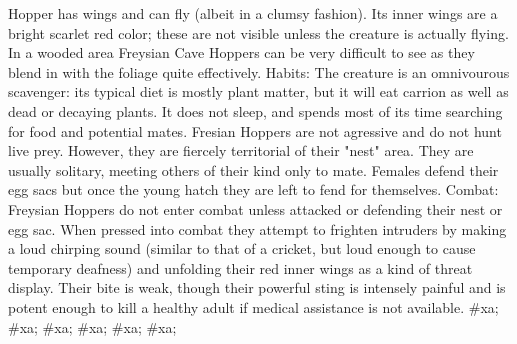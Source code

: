 \documentclass[twoside]{book}
\begin{document}
\begin{multicols}{2}
{           Hopper has wings and can fly (albeit in a clumsy fashion). Its
           inner wings are a bright scarlet red color; these are not
           visible unless the creature is actually flying. In a wooded
           area Freysian Cave Hoppers can be very difficult to see as
           they blend in with the foliage quite effectively. Habits: The
           creature is an omnivourous scavenger: its typical diet is
           mostly plant matter, but it will eat carrion as well as dead
           or decaying plants. It does not sleep, and spends most of its
           time searching for food and potential mates. Fresian Hoppers
           are not agressive and do not hunt live prey. However, they are
           fiercely territorial of their "nest" area. They are usually
           solitary, meeting others of their kind only to mate. Females
           defend their egg sacs but once the young hatch they are left
           to fend for themselves. Combat: Freysian Hoppers do not enter
           combat unless attacked or defending their nest or egg sac.
           When pressed into combat they attempt to frighten intruders by
           making a loud chirping sound (similar to that of a cricket,
           but loud enough to cause temporary deafness) and unfolding
           their red inner wings as a kind of threat display. Their bite
           is weak, though their powerful sting is intensely painful and
           is potent enough to kill a healthy adult if medical assistance
           is not available. }\vspace{1ex}
    \hspace{-2ex}
\#xa;
\#xa;
\vspace{1ex}
    \hspace{-2ex}
\#xa;
\#xa;
\vspace{1ex}
    \hspace{-2ex}
\#xa;
\#xa;
\vspace{1ex}
    \hspace{-2ex}

\end{multicols}
\end{document}
